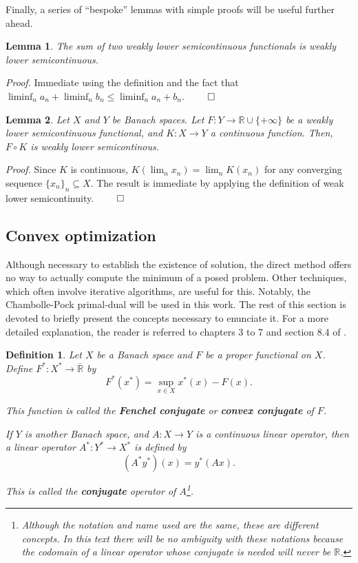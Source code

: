 \documentclass[twocolumn,twoside,a4paper,10pt]{IEEEtran}
\newtheorem{definition}{Definition}
\newtheorem{lemma}{Lemma}
\begin{document}
Finally, a series of ``bespoke'' lemmas with simple proofs will be useful further ahead.

\begin{lemma}\label{lemma:sum-of-lsc}
  The sum of two weakly lower semicontinuous functionals is weakly lower semicontinuous.
\end{lemma}

\textit{Proof.} Immediate using the definition and the fact that \(\liminf_n{a_n} + \liminf_n{b_n}\leq \liminf_n{a_n + b_n}\). \(\qed\)

\begin{lemma}\label{lemma:precomposition-with-linear}
  Let \(X\) and \(Y\) be Banach spaces. Let \(F\colon Y\to \mathbb{R}\cup\{+\infty\}\) be a weakly lower semicontinuous functional, and \(K\colon X\to Y\) a continuous function. Then, \(F\circ K\) is weakly lower semicontinous.
\end{lemma}

\textit{Proof.} Since \(K\) is continuous, \(K(\lim_n x_n) = \lim_n K(x_n)\) for any converging sequence \(\{x_n\}_n\subseteq X\). The result is immediate by applying the definition of weak lower semicontinuity. \(\qed\)

\subsection{Convex optimization} Although necessary to establish the existence of solution, the direct method offers no way to actually compute the minimum of a posed problem. Other techniques, which often involve iterative algorithms, are useful for this. Notably, the Chambolle-Pock primal-dual will be used in this work. The rest of this section is devoted to briefly present the concepts necessary to enunciate it. For a more detailed explanation, the reader is referred to chapters 3 to 7 and section 8.4 of \cite{clason2024introductionnonsmoothanalysisoptimization}.

\begin{definition}
  Let \(X\) be a Banach space and \(F\) be a proper functional on \(X\). Define \(F^*\colon X^*\to\overline{\mathbb{R}}\) by
  \[
    F^*(x^*) = \sup_{x\in X}x^*(x) - F(x)
  .\]

  This function is called the \textbf{Fenchel conjugate} or \textbf{convex conjugate} of \(F\).

  If \(Y\) is another Banach space, and \(A\colon X\to Y\) is a continuous linear operator, then a linear operator \(A^*\colon Y^*\to X^*\) is defined by
  \[
     (A^*y^*)(x) = y^*(Ax)
  .\]

  This is called the \textbf{conjugate} operator of \(A\)\footnote{Although the notation and name used are the same, these are different concepts. In this text there will be no ambiguity with these notations because the codomain of a linear operator whose conjugate is needed will never be \(\mathbb{R}\).}.
\end{definition}
\end{document}
